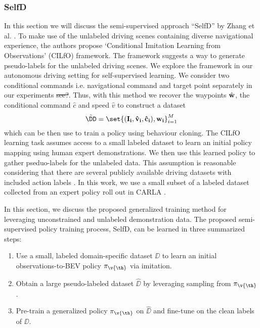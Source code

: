 \documentclass[letterpaper, 12pt]{article}
\theoremstyle{definition}
\theoremstyle{definition}
\theoremstyle{definition}
\theoremstyle{definition}
\theoremstyle{definition}
\begin{document}
\subsubsection{SelfD}
\label{sec:orgbb73d8f}
In this section we will discuss the semi-supervised approach ``SelfD''
by Zhang et al. \cite{Zhang2022a}.
\label{sec:org579e5fd}
To make use of the unlabeled driving scenes containing diverse navigational
experience, the authors propose `Conditional Imitation Learning from
Observations' (CILfO) \cite{Zhang2022a} framework. The framework suggests a way
to generate pseudo-labels for the unlabeled driving scenes. We explore the
framework in our autonomous driving setting for self-supervised learning. We
consider two conditional commands i.e. navigational command and target point
separately in our experiments \sout{see?}. Thus, with this method we recover the
waypoints \(\hat{\bf w}\), the conditional command \(\hat{c}\) and speed
\(\hat{v}\) to construct a dataset \[\hat{\DD}=\set{(\bf I_{i}, \hat v_{i}, \hat
c_{i}), \bf w_{i}}_{i=1}^{M}\] which can be then use to train a policy using
behaviour cloning.
\label{sec:org739777a}
The CILfO learning task assumes access to a small labeled dataset to learn an
initial policy mapping using human expert demonstrations. We then use this
learned policy to gather pseduo-labels for the unlabeled data. This assumption
is reasonable considering that there are several publicly available driving
datasets with included action labels \cite{Geiger2012AreWR,Argoverse2}. In this
work, we use a small subset of a labeled dataset collected from an expert policy
roll out in CARLA \cite{Dosovitskiy2017}.

\label{sec:org8c856e8}
In this section, we discuss the proposed generalized training method for
leveraging unconstrained and unlabeled demonstration data. The proposed
semi-supervised policy training process, SelfD, can be learned in three
summarized steps:
\begin{enumerate}
\item Use a small, labeled domain-specific dataset \(\DD\) to learn an initial
observations-to-BEV policy \(\pi_{\v{\th}}\) via imitation.
\item Obtain a large pseudo-labeled dataset \(\hat{\DD}\) by leveraging
sampling from \(\pi_{\v{\th}}\).
\item Pre-train a generalized policy \(\pi_{\v{\th}}\) on \(\hat{\DD}\) and
fine-tune on the clean labels of \(\DD\).
\end{enumerate}
\end{document}
